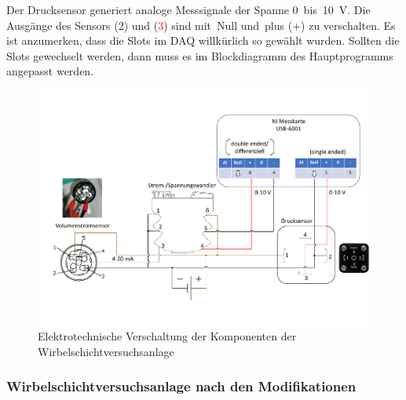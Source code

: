 Der Drucksensor generiert analoge Messsignale der Spanne 0~bis~10~V. Die Ausgänge des Sensors (2) und (\textcolor{red}{3}) sind mit \,{\Menlo Null} und \,{\Menlo plus} (+) zu verschalten. Es ist anzumerken, dass die Slots im DAQ willkürlich so gewählt wurden. Sollten die Slots gewechselt werden, dann muss es im Blockdiagramm des Hauptprogramms angepasst werden.\\


\begin{figure}[t!] %
\centering
\vspace{-7em}
\includegraphics[width=1.02\textwidth]{Bilder/Wirbelschicht_Messtechnik.pdf}
\vspace{-4.5em}
 \caption[]{Elektrotechnische Verschaltung der Komponenten der Wirbelschichtversuchsanlage}\label{fig:wirbelelektrotechnik}
\end{figure}

\subsubsection{Wirbelschichtversuchsanlage nach den Modifikationen}

